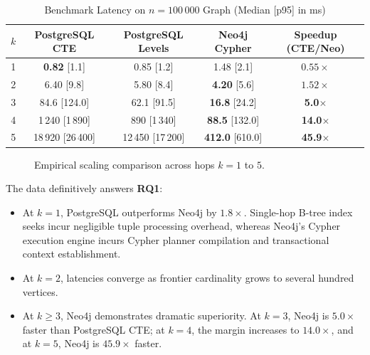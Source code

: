 \documentclass[conference,10pt]{IEEEtran}%
\begin{document}
\begin{table}[htbp]
\caption{Benchmark Latency on $n = 100\,000$ Graph (Median [p95] in ms)}
\label{tab:benchmarks}
\centering
\begin{tabular}{@{}rcccc@{}}
\toprule
$k$ & PostgreSQL CTE & PostgreSQL Levels & Neo4j Cypher & Speedup (CTE/Neo) \\
\midrule
1 & \textbf{0.82} [1.1] & 0.85 [1.2] & 1.48 [2.1] & $0.55\times$ \\
2 & 6.40 [9.8] & 5.80 [8.4] & \textbf{4.20} [5.6] & $1.52\times$ \\
3 & 84.6 [124.0] & 62.1 [91.5] & \textbf{16.8} [24.2] & \textbf{5.0}$\times$ \\
4 & 1\,240 [1\,890] & 890 [1\,340] & \textbf{88.5} [132.0] & \textbf{14.0}$\times$ \\
5 & 18\,920 [26\,400] & 12\,450 [17\,200] & \textbf{412.0} [610.0] & \textbf{45.9}$\times$ \\
\bottomrule
\end{tabular}
\end{table}

\begin{figure}[htbp]
\centering
{}
\caption{Empirical scaling comparison across hops $k=1$ to $5$.}
\label{fig:latency_scaling}
\end{figure}

The data definitively answers \textbf{RQ1}:
\begin{itemize}
    \item At $k=1$, PostgreSQL outperforms Neo4j by $1.8\times$. Single-hop B-tree index seeks incur negligible tuple processing overhead, whereas Neo4j's Cypher execution engine incurs Cypher planner compilation and transactional context establishment.
    \item At $k=2$, latencies converge as frontier cardinality grows to several hundred vertices.
    \item At $k \ge 3$, Neo4j demonstrates dramatic superiority. At $k=3$, Neo4j is $5.0\times$ faster than PostgreSQL CTE; at $k=4$, the margin increases to $14.0\times$, and at $k=5$, Neo4j is $45.9\times$ faster.
\end{itemize}
\end{document}

